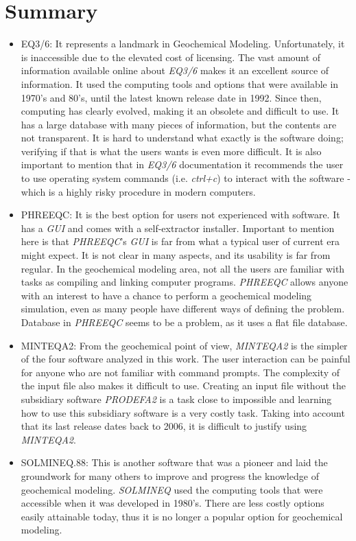 \section{Summary}
\begin{itemize}
\item EQ3/6: It represents a landmark in Geochemical Modeling. Unfortunately, it is inaccessible due to the elevated cost of licensing. The vast amount of information available online about \emph{EQ3/6} makes it an excellent source of information.  It used the computing tools and options that were available in 1970’s and 80’s, until the latest known release date in 1992. Since then, computing has clearly evolved, making it an obsolete and difficult to use. It has a large database with many pieces of information, but the contents are not transparent. It is hard to understand what exactly is the software doing; verifying if that is what the users wants is even more difficult. It is also important to mention that in \emph{EQ3/6}  documentation it recommends the user to use operating system commands (i.e. \emph{ctrl+c}) to interact with the software - which is a highly risky procedure in modern computers.

\item PHREEQC: It is the best option for users not experienced with software. It has a \emph{GUI} and comes with a self-extractor installer. Important to mention here is that \emph{PHREEQC}'s \emph{GUI} is far from what a typical user of current era might expect. It is not clear in many aspects, and its usability is far from regular. In the geochemical modeling area, not all the users are familiar with tasks as compiling and linking computer programs. \emph{PHREEQC} allows anyone with an interest to have a chance to perform a geochemical modeling simulation, even as many people have different ways of defining the problem. Database in \emph{PHREEQC} seems to be a problem, as it uses a flat file database.

\item MINTEQA2: From the geochemical point of view, \emph{MINTEQA2} is the simpler of the four software analyzed in this work. The user interaction can be painful for anyone who are not familiar with command prompts. The complexity of the input file also makes it difficult to use. Creating an input file without the subsidiary software \emph{PRODEFA2} is a task close to impossible and learning how to use this subsidiary software is a very costly task. Taking into account that its last release dates back to 2006, it is difficult to justify using \emph{MINTEQA2}.

\item SOLMINEQ.88: This is another software that was a pioneer and laid the groundwork for many others to improve and progress the knowledge of geochemical modeling. \emph{SOLMINEQ} used the computing tools that were accessible when it was developed in 1980’s. There are less costly options easily attainable today, thus it is no longer a popular option for geochemical modeling.


\end{itemize}